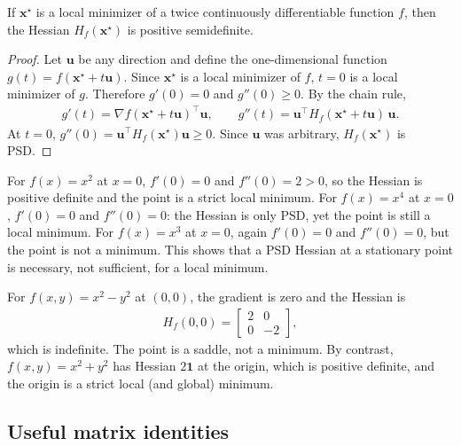 \documentclass[a4paper, 12pt]{book}
\begin{document}
\begin{theorem}
    If $\mathbf{x}^\star$ is a local minimizer of a twice continuously differentiable
    function $f$, then the Hessian $H_f(\mathbf{x}^\star)$ is positive semidefinite.
\end{theorem}
\begin{proof}
    Let $\mathbf{u}$ be any direction and define the one-dimensional function
    $g(t) = f(\mathbf{x}^\star + t\mathbf{u})$. Since $\mathbf{x}^\star$ is a local
    minimizer of $f$, $t=0$ is a local minimizer of $g$. Therefore
    $g'(0)=0$ and $g''(0)\geq 0$. By the chain rule,
    \begin{align}
        g'(t) = \nabla f(\mathbf{x}^\star+t\mathbf{u})^\top\mathbf{u},
        \qquad
        g''(t) = \mathbf{u}^\top H_f(\mathbf{x}^\star+t\mathbf{u})\,\mathbf{u}.
    \end{align}
    At $t=0$, $g''(0)=\mathbf{u}^\top H_f(\mathbf{x}^\star)\mathbf{u}\geq 0$. Since
    $\mathbf{u}$ was arbitrary, $H_f(\mathbf{x}^\star)$ is PSD.
\end{proof}

\begin{example}
    For $f(x)=x^2$ at $x=0$, $f'(0)=0$ and $f''(0)=2>0$, so the Hessian is positive
    definite and the point is a strict local minimum. For $f(x)=x^4$ at $x=0$,
    $f'(0)=0$ and $f''(0)=0$: the Hessian is only PSD, yet the point is still a local
    minimum. For $f(x)=x^3$ at $x=0$, again $f'(0)=0$ and $f''(0)=0$, but the point is
    not a minimum. This shows that a PSD Hessian at a stationary point is necessary,
    not sufficient, for a local minimum.
\end{example}

\begin{example}
    For $f(x,y)=x^2-y^2$ at $(0,0)$, the gradient is zero and the Hessian is
    \begin{align}
        H_f(0,0) = \begin{bmatrix}2&0\\0&-2\end{bmatrix},
    \end{align}
    which is indefinite. The point is a saddle, not a minimum. By contrast,
    $f(x,y)=x^2+y^2$ has Hessian $2\mathbf{1}$ at the origin, which is positive
    definite, and the origin is a strict local (and global) minimum.
\end{example}

\subsection{Useful matrix identities}
\end{document}
